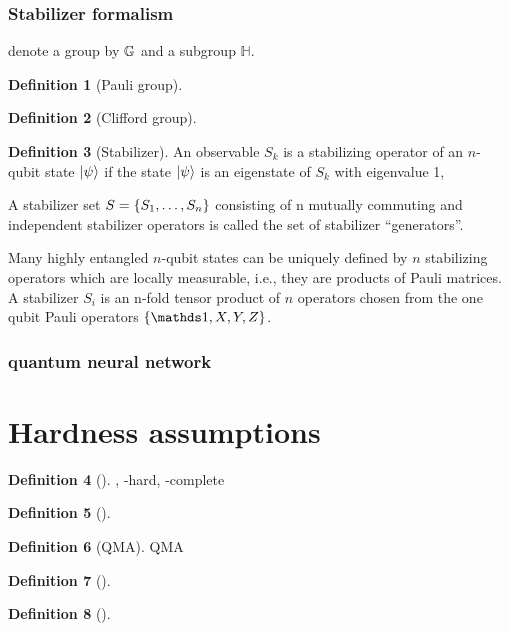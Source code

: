 \documentclass[
10pt,
aps,
pra,
linenumbers,
floatfix,
]{revtex4-2}
\theoremstyle{plain}
\theoremstyle{definition}
\newtheorem{definition}{Definition}
\newcommand{\subgroup}{\mathbb{H}}
\begin{document}
\subsubsection{Stabilizer formalism}\label{sec:stabilizer_formalism}
denote a group by $\mathbb{G}$ and a subgroup $\subgroup$. 
\begin{definition}[Pauli group]
\end{definition}
\begin{definition}[Clifford group]\label{def:clifford}
\end{definition}
\begin{definition}[Stabilizer]\label{def:stabilizer}
	An observable $S_k$ is a stabilizing operator of an $n$-qubit state $\ket{\psi}$ if the state $\ket{\psi}$ is an eigenstate of $S_k$ with eigenvalue 1,

	A stabilizer set $S = \qty{ S_1, \dots , S_n}$ consisting of n mutually commuting and independent stabilizer operators is called the set of stabilizer “generators”.
\end{definition}
Many highly entangled $n$-qubit states can be uniquely defined by $n$ stabilizing operators which are locally measurable, i.e., they are products of Pauli matrices.
A stabilizer $S_i$ is an n-fold tensor product of $n$ operators chosen from the one qubit Pauli operators $\qty{\identity,X,Y,Z}$.

\subsubsection{quantum neural network}\label{sec:quantum_neural_network}

\section{Hardness assumptions}
\begin{definition}[\NP]\label{def:np}
	\NP, \NP-hard, \NP-complete
\end{definition}
\begin{definition}[\sharpP]\label{def:sharpp}
	\sharpP
\end{definition}
\begin{definition}[QMA]\label{def:qma}
	QMA
\end{definition}
\begin{definition}[\BPP]\label{def:bpp}
	\BPP
\end{definition}
\begin{definition}[\BQP]\label{def:bqp}
	\BQP
\end{definition}

\end{document}
